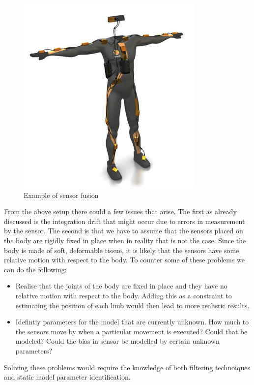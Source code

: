 \begin{figure}[H]
	\centering 
	\includegraphics[scale = 0.4]{Lecture 1/images/motion capture}
	\caption{Example of sensor fusion}
	\label{motion capture}
\end{figure}
From the above setup there could a few issues that arise. The first as already discussed is the integration drift that might occur due to errors in measurement by the sensor. The second is that we have to assume that the sensors placed on the body are rigidly fixed in place when in reality that is not the case. Since the body is made of soft, deformable tissue, it is likely that the sensors have some relative motion with respect to the body. To counter some of these problems we can do the following: 
\begin{itemize} 
	\item Realise that the joints of the body are fixed in place and they have no relative motion with respect to the body. Adding this as a constraint to estimating the position of each limb would then lead to more realistic results. 
	\item Idefintiy parameters for the model that are currently unknown. How much to the sensors move by when a particular movement is executed? Could that be modeled? Could the bias in sensor be modelled by certain unknown parameters? 
\end{itemize} 
Soliving these problems would require the knowledge of both filtering technoiques and static model parameter identification.
